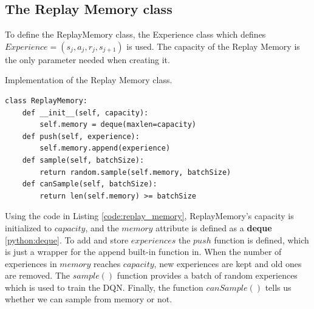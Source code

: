 \documentclass[12pt,oneside]{article}
\begin{document}
\subsection{The Replay Memory class}
To define the ReplayMemory class, the Experience class which defines $Experience=(s_j, a_j, r_j, s_{j+1})$ is used. The capacity of the Replay Memory is the only parameter needed when creating it.
\begin{listing}[htbp]
\caption{Implementation of the Replay Memory class.}
\label{code:replay_memory}
\begin{tcolorbox}[]
\begin{verbatim}
class ReplayMemory:
    def __init__(self, capacity):
        self.memory = deque(maxlen=capacity)
    def push(self, experience):
        self.memory.append(experience)
    def sample(self, batchSize):
        return random.sample(self.memory, batchSize)
    def canSample(self, batchSize):
        return len(self.memory) >= batchSize
\end{verbatim}
\end{tcolorbox}
\end{listing} 

Using the code in Listing \ref{code:replay_memory}, ReplayMemory's capacity is initialized to $capacity$, and the $memory$ attribute is defined as a \textbf{deque} \ref{python:deque}. To add and store $experiences$ the $push$ function is defined, which is just a wrapper for the append built-in function in. When the number of experiences in $memory$ reaches $capacity$, new experiences are kept and old ones are removed. The $sample()$ function provides a batch of random experiences which is used to train the DQN. Finally, the function $canSample()$ tells us whether we can sample from memory or not.
\end{document}
